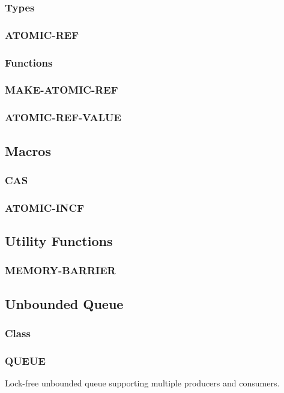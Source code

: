 \documentclass[12pt, letterpaper]{article}
\begin{document}
	\subsubsection*{Types}
	\subsubsection{ATOMIC-REF}
	\subsubsection*{Functions}
	\subsubsection{MAKE-ATOMIC-REF}
	\subsubsection{ATOMIC-REF-VALUE}
	
	\subsection{Macros}
	\subsubsection{CAS}
	\subsubsection{ATOMIC-INCF}
	
	\subsection{Utility Functions}
	\subsubsection{MEMORY-BARRIER}
	
	\subsection{Unbounded Queue}
	\subsubsection*{Class}
	\subsubsection{QUEUE}
	Lock-free unbounded queue supporting multiple producers and consumers.
\end{document}
